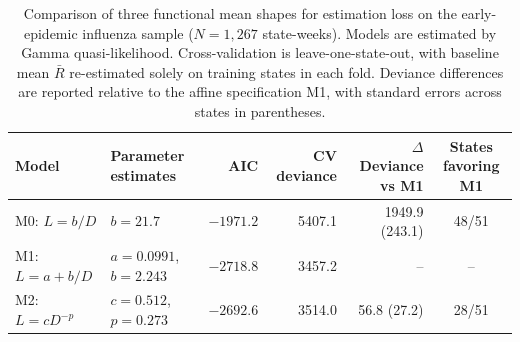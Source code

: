 \begin{table}[!tbp]
  \centering
  \caption{Comparison of three functional mean shapes for estimation loss on the early-epidemic influenza sample ($N = 1{,}267$ state-weeks). Models are estimated by Gamma quasi-likelihood. Cross-validation is leave-one-state-out, with baseline mean $\bar{R}$ re-estimated solely on training states in each fold. Deviance differences are reported relative to the affine specification M1, with standard errors across states in parentheses.}
  \label{tab:shape}
  \small
  \begin{tabular}{@{}llrrrc@{}}
    \toprule
    Model & Parameter estimates & AIC & CV deviance & $\Delta$Deviance vs M1 & States favoring M1 \\
    \midrule
    M0: $L = b/D$ & $b = 21.7$ & $-1971.2$ & 5407.1 & 1949.9 (243.1) & 48/51 \\
    M1: $L = a + b/D$ & $a = 0.0991$, $b = 2.243$ & $-2718.8$ & 3457.2 & -- & -- \\
    M2: $L = c D^{-p}$ & $c = 0.512$, $p = 0.273$ & $-2692.6$ & 3514.0 & 56.8 (27.2) & 28/51 \\
    \bottomrule
  \end{tabular}
\end{table}
